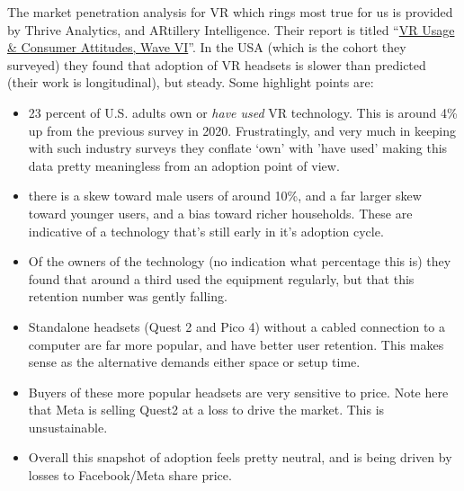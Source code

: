 The market penetration analysis for VR which rings most true for us is provided by Thrive Analytics, and ARtillery Intelligence. Their report is titled ``\href{https://artilleryiq.com/reports/vr-usage-consumer-attitudes-wave-vi/}{VR Usage \& Consumer Attitudes, Wave VI}''. In the USA (which is the cohort they surveyed) they found that adoption of VR headsets is slower than predicted (their work is longitudinal), but steady. Some highlight points are:
\begin{itemize}
\item 23 percent of U.S. adults own or \textit{have used} VR technology. This is around 4\% up from the previous survey in 2020. Frustratingly, and very much in keeping with such industry surveys they conflate `own' with 'have used' making this data pretty meaningless from an adoption point of view.
\item there is a skew toward male users of around 10\%, and a far larger skew toward younger users, and a bias toward richer households. These are indicative of a technology that's still early in it's adoption cycle.
\item Of the owners of the technology (no indication what percentage this is) they found that around a third used the equipment regularly, but that this retention number was gently falling.
\item Standalone headsets (Quest 2 and Pico 4) without a cabled connection to a computer are far more popular, and have better user retention. This makes sense as the alternative demands either space or setup time.
\item Buyers of these more popular headsets are very sensitive to price. Note here that Meta is selling Quest2 at a loss to drive the market. This is unsustainable.
\item Overall this snapshot of adoption feels pretty neutral, and is being driven by losses to Facebook/Meta share price.
\end{itemize}

